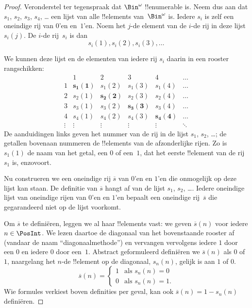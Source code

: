 \documentclass[openany]{memoir}
\begin{document}
\begin{proof}
Veronderstel ter tegenspraak dat $\Bin^\omega$ !!{enumerable} is. Neem
dus aan dat $s_{1}$, $s_{2}$, $s_{3}$, $s_{4}$, \dots{} een lijst van
alle !!{element}s van~$\Bin^\omega$ is. Iedere $s_i$ is zelf een
oneindige rij van $0$'en en~$1$'en. Noem het $j$-de element van de
$i$-de rij in deze lijst $s_i(j)$. De $i$-de rij~$s_i$ is dan
\[
s_i(1), s_i(2), s_i(3), \dots
\]

We kunnen deze lijst en de elementen van iedere rij $s_i$ daarin in een
rooster rangschikken:
\[
\begin{array}{c|c|c|c|c|c}
& 1 & 2 & 3 & 4 & \dots \\\hline
1 & \mathbf{s_{1}(1)} & s_{1}(2) & s_{1}(3) & s_1(4) & \dots \\\hline
2 & s_{2}(1)& \mathbf{s_{2}(2)} & s_2(3) & s_2(4) & \dots \\\hline
3 & s_{3}(1)& s_{3}(2) & \mathbf{s_3(3)} & s_3(4) & \dots \\\hline
4 & s_{4}(1)& s_{4}(2) & s_4(3) & \mathbf{s_4(4)} & \dots \\\hline
\vdots & \vdots & \vdots & \vdots & \vdots & \mathbf{\ddots}
\end{array}
\]
De aanduidingen links geven het nummer van de rij in de lijst $s_1$,
$s_2$, \dots; de getallen bovenaan nummeren de !!{element}s van de
afzonderlijke rijen. Zo is $s_{1}(1)$ de naam van het getal, een $0$ of
een~$1$, dat het eerste !!{element} van de rij $s_{1}$ is, enzovoort.

Nu construeren we een oneindige rij $\overline{s}$ van $0$'en en $1$'en
die onmogelijk op deze lijst kan staan. De definitie van $\overline{s}$
hangt af van de lijst $s_1$, $s_2$, \dots. Iedere oneindige lijst van
oneindige rijen van $0$'en en $1$'en bepaalt een oneindige
rij~$\overline{s}$ die gegarandeerd niet op de lijst voorkomt.

Om $\overline{s}$ te definiëren, leggen we al haar !!{element}s vast:
we geven $\overline{s}(n)$ voor iedere $n \in \PosInt$. We lezen daartoe
de diagonaal van het bovenstaande rooster af (vandaar de naam
``diagonaalmethode'') en vervangen vervolgens iedere $1$ door een $0$
en iedere $0$ door een~$1$. Abstract geformuleerd definiëren we
$\overline{s}(n)$ als $0$ of $1$, naargelang het $n$-de !!{element} op
de diagonaal, $s_n(n)$, gelijk is aan $1$ of $0$.
\[
\overline{s}(n) =
\begin{cases}
1 & \text{als $s_{n}(n) = 0$}\\
0 & \text{als $s_{n}(n) = 1$}.
\end{cases}
\]
Wie formules verkiest boven definities per geval, kan ook
$\overline{s}(n) = 1 - s_n(n)$ definiëren.


\end{proof}
\end{document}
